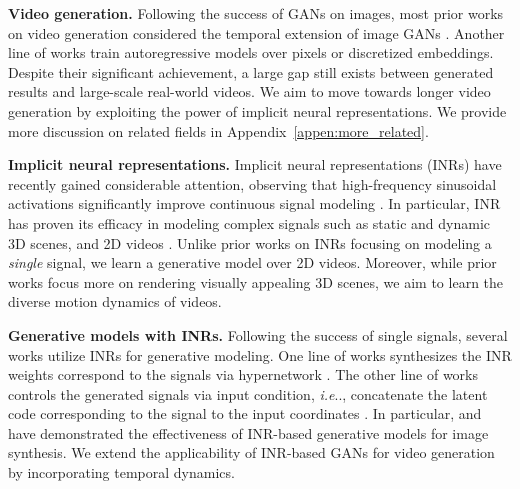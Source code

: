 \documentclass{article} \usepackage{iclr2022_conference,times}
\makeatletter
\DeclareRobustCommand\onedot{\futurelet\@let@token\@onedot}
\def\@onedot{\ifx\@let@token.\else.\null\fi\xspace}
\def\ie{\emph{i.e}\onedot} \def\Ie{\emph{I.e}\onedot}
\makeatother
\begin{document}
\textbf{Video generation.}
Following the success of GANs on images, most prior works on video generation considered the temporal extension of image GANs \citep{vondrick2016generating,saito2017temporal,saito2020train,tulyakov2018mocogan,acharya2018towards,clark2019adversarial,yushchenko2019markov,kahembwe2020lower,gordon2021latent,tian2021good, fox2021stylevideogan,munoz2021temporal}. Another line of works \citep{kalchbrenner2017video,weissenborn2020scaling,rakhimov2020latent,yan2021videogpt} train autoregressive models over pixels or discretized embeddings. Despite their significant achievement, a large gap still exists between generated results and large-scale real-world videos. We aim to move towards longer video generation by exploiting the power of implicit neural representations. 
We provide more discussion on related fields in Appendix~\ref{appen:more_related}.

\textbf{Implicit neural representations.}
Implicit neural representations (INRs) have recently gained considerable attention, observing that high-frequency sinusoidal activations significantly improve continuous signal modeling \citep{sitzmann2020implicit,tancik2020fourier}. In particular, INR has proven its efficacy in modeling complex signals such as static \citep{chen2021learning,park2021deformable,martin2021nerf} and dynamic \citep{li2021neural,li2021scene,pumarola2021d,xian2021space} 3D scenes, and 2D videos \citep{chen2021nerv}.
Unlike prior works on INRs focusing on modeling a \emph{single} signal, we learn a generative model over 2D videos. Moreover, while prior works focus more on rendering visually appealing 3D scenes, we aim to learn the diverse motion dynamics of videos.

\textbf{Generative models with INRs.}
Following the success of single signals, several works utilize INRs for generative modeling. One line of works synthesizes the INR weights correspond to the signals via hypernetwork \citep{skorokhodov2021adversarial,anokhin2021image,chan2021pi,dupont2021generative}. The other line of works controls the generated signals via input condition, \ie, concatenate the latent code corresponding to the signal to the input coordinates \citep{schwarz2020graf,kosiorek2021nerf}. In particular, \citet{skorokhodov2021adversarial} and \citet{anokhin2021image} have demonstrated the effectiveness of INR-based generative models for image synthesis. We extend the applicability of INR-based GANs for video generation by incorporating temporal dynamics.


\section{\mname}
\label{sec:method}
\end{document}
